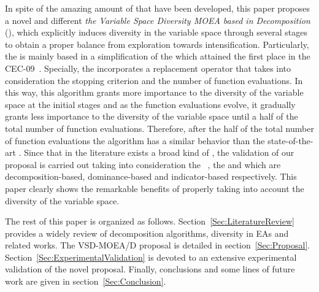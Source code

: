 In spite of the amazing amount of \MOEAS{} that have been developed, this paper proposes a novel and different \MOEA{} \textit{the Variable Space Diversity MOEA based in Decomposition} (\VSDMOEAD{}), which explicitly induces diversity in the variable space through several stages to obtain a proper balance from exploration towards intensification.
%
Particularly, the \VSDMOEAD{} is mainly based in a simplification of the \MOEADDE{} which attained the first place in the CEC-09~\cite{zhang2009performance}.
%
Specially, the \VSDMOEAD{} incorporates a replacement operator that takes into consideration the stopping criterion and the number of function evaluations.
%
In this way, this algorithm grants more importance to the diversity of the variable space at the initial stages and as the function evaluations evolve, it gradually grants less importance to the diversity of the variable space until a half of the total number of function evaluations.
%
Therefore, after the half of the total number of function evaluations the algorithm has a similar behavior than the state-of-the-art \MOEAS{}.
%
Since that in the literature exists a broad kind of \MOEAS{}, the validation of our proposal is carried out taking into consideration the \MOEADDE{}~\cite{zhang2009performance}, the \NSGAIII{} and \REMOA{} which are decomposition-based, dominance-based and indicator-based respectively.
%
This paper clearly shows the remarkable benefits of properly taking into account the diversity of the variable space.

The rest of this paper is organized as follows.
%
Section~\ref{Sec:LiteratureReview} provides a widely review of decomposition algorithms, diversity in EAs and related works.
%
The VSD-MOEA/D proposal is detailed in section~\ref{Sec:Proposal}.
%
Section~\ref{Sec:ExperimentalValidation} is devoted to an extensive experimental validation of the novel proposal.
%
Finally, conclusions and some lines of future work are given in section~\ref{Sec:Conclusion}.
%
